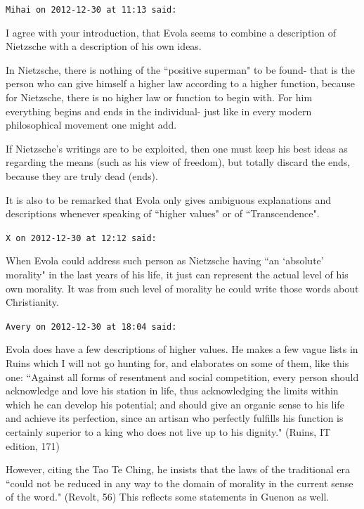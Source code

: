 \begin{footnotesize}\begin{sffamily}



\texttt{Mihai on 2012-12-30 at 11:13 said: }

I agree with your introduction, that Evola seems to combine a description of Nietzsche with a description of his own ideas. 

In Nietzsche, there is nothing of the ``positive superman" to be found- that is the person who can give himself a higher law according to a higher function, because for Nietzsche, there is no higher law or function to begin with. For him everything begins and ends in the individual- just like in every modern philosophical movement one might add. 

If Nietzsche's writings are to be exploited, then one must keep his best ideas as regarding the means (such as his view of freedom), but totally discard the ends, because they are truly dead (ends). 

It is also to be remarked that Evola only gives ambiguous explanations and descriptions whenever speaking of ``higher values" or of ``Transcendence".


\hfill

\texttt{X on 2012-12-30 at 12:12 said: }

When Evola could address such person as Nietzsche having ``an `absolute' morality" in the last years of his life, it just can represent the actual level of his own morality. It was from such level of morality he could write those words about Christianity.


\hfill

\texttt{Avery on 2012-12-30 at 18:04 said: }

Evola does have a few descriptions of higher values. He makes a few vague lists in Ruins which I will not go hunting for, and elaborates on some of them, like this one: ``Against all forms of resentment and social competition, every person should acknowledge and love his station in life, thus acknowledging the limits within which he can develop his potential; and should give an organic sense to his life and achieve its perfection, since an artisan who perfectly fulfills his function is certainly superior to a king who does not live up to his dignity." (Ruins, IT edition, 171)

However, citing the Tao Te Ching, he insists that the laws of the traditional era ``could not be reduced in any way to the domain of morality in the current sense of the word." (Revolt, 56) This reflects some statements in Guenon as well.


\end{sffamily}
\end{footnotesize}
